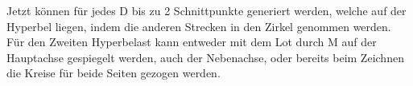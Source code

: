 Jetzt können für jedes D bis zu 2 Schnittpunkte generiert werden, welche auf der Hyperbel liegen, indem die anderen Strecken in den Zirkel genommen werden. Für den Zweiten Hyperbelast kann entweder mit dem Lot durch M auf der Hauptachse gespiegelt werden, auch der Nebenachse, oder bereits beim Zeichnen die Kreise für beide Seiten gezogen werden.\\